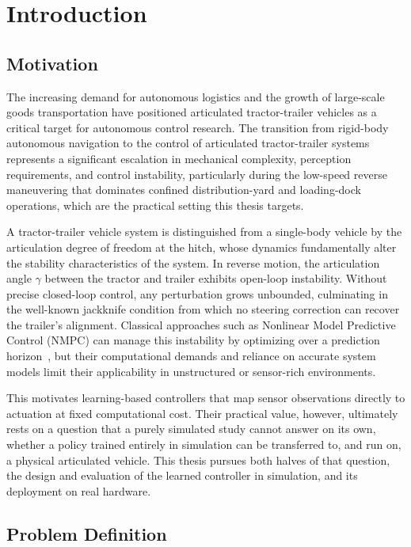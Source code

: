 \chapter{Introduction}
\label{ch:introduction}

\section{Motivation}

The increasing demand for autonomous logistics and the growth of large-scale goods transportation have positioned articulated tractor-trailer vehicles as a critical target for autonomous control research. The transition from rigid-body autonomous navigation to the control of articulated tractor-trailer systems represents a significant escalation in mechanical complexity, perception requirements, and control instability, particularly during the low-speed reverse maneuvering that dominates confined distribution-yard and loading-dock operations, which are the practical setting this thesis targets.

A tractor-trailer vehicle system is distinguished from a single-body vehicle by the articulation degree of freedom at the hitch, whose dynamics fundamentally alter the stability characteristics of the system. In reverse motion, the articulation angle $\gamma$ between the tractor and trailer exhibits open-loop instability. Without precise closed-loop control, any perturbation grows unbounded, culminating in the well-known jackknife condition from which no steering correction can recover the trailer's alignment. Classical approaches such as Nonlinear Model Predictive Control (NMPC) can manage this instability by optimizing over a prediction horizon~\cite{mayne2000constrained}, but their computational demands and reliance on accurate system models limit their applicability in unstructured or sensor-rich environments.

This motivates learning-based controllers that map sensor observations directly to actuation at fixed computational cost. Their practical value, however, ultimately rests on a question that a purely simulated study cannot answer on its own, whether a policy trained entirely in simulation can be transferred to, and run on, a physical articulated vehicle. This thesis pursues both halves of that question, the design and evaluation of the learned controller in simulation, and its deployment on real hardware.

\section{Problem Definition}

